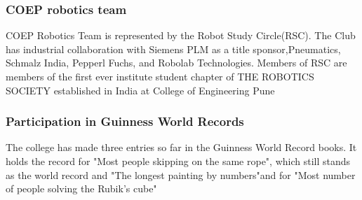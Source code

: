 \documentclass{article}
\begin{document}
\subsubsection{COEP robotics team}
COEP Robotics Team is represented by the Robot Study Circle(RSC). The Club has industrial collaboration with Siemens PLM as a title sponsor,Pneumatics, Schmalz India, Pepperl Fuchs, and Robolab Technologies. Members of RSC are members of the first ever institute student chapter of THE ROBOTICS SOCIETY established in India at College of Engineering Pune
\subsubsection{Participation in Guinness World Records}
The college has made three entries so far in the Guinness World Record books. It holds the record for "Most people skipping on the same rope", which still stands as the world record and "The longest painting by numbers"and for "Most number of people solving the Rubik's cube"
\end{document}
